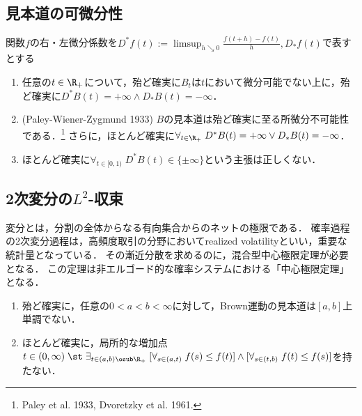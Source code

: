 \documentclass[uplatex,dvipdfmx]{jsreport}
\begin{document}
\subsection{見本道の可微分性}


\begin{proposition}
    関数$f$の右・左微分係数を$D^*f(t):=\limsup_{h\searrow0}\frac{f(t+h)-f(t)}{h},D_*f(t)$で表すとする
    \begin{enumerate}
        \item 任意の$t\in\R_+$について，殆ど確実に$B_t$は$t$において微分可能でない上に，殆ど確実に$D^*B(t)=+\infty\land D_*B(t)=-\infty$．
        \item (Paley-Wiener-Zygmund 1933) $B$の見本道は殆ど確実に至る所微分不可能性である．\footnote{Paley et al. 1933, Dvoretzky et al. 1961.}
        さらに，ほとんど確実に$\forall_{t\in\R_+}\;D^*B(t)=+\infty\lor D_*B(t)=-\infty$．
        \item ほとんど確実に$\forall_{t\in[0,1)}\;D^*B(t)\in\{\pm\infty\}$という主張は正しくない．
    \end{enumerate}
\end{proposition}

\subsection{2次変分の$L^2$-収束}

\begin{tcolorbox}[colframe=ForestGreen, colback=ForestGreen!10!white,breakable,colbacktitle=ForestGreen!40!white,coltitle=black,fonttitle=\bfseries\sffamily,
title=]
    変分とは，分割の全体からなる有向集合からのネットの極限である．
    確率過程の2次変分過程は，高頻度取引の分野においてrealized volatilityといい，重要な統計量となっている．
    その漸近分散を求めるのに，混合型中心極限定理が必要となる．
    この定理は非エルゴード的な確率システムにおける「中心極限定理」となる．
\end{tcolorbox}

\begin{proposition}[erratic]\mbox{}
    \begin{enumerate}
        \item 殆ど確実に，任意の$0<a<b<\infty$に対して，Brown運動の見本道は$[a,b]$上単調でない．
        \item ほとんど確実に，局所的な増加点$t\in(0,\infty)\;\st\;\exists_{t\in(a,b)\osub\R_+}\;[\forall_{s\in(a,t)}\;f(s)\le f(t)]\land[\forall_{s\in(t,b)}\;f(t)\le f(s)]$を持たない．
    \end{enumerate}
\end{proposition}
\end{document}
